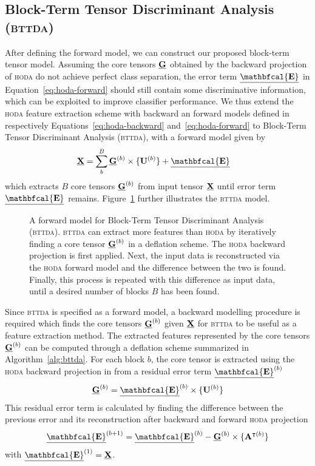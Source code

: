\documentclass[twocolumn]{article}
\begin{document}
\subsection{Block-Term Tensor Discriminant Analysis (\textsc{bttda})}
After defining the forward model, we can construct our proposed block-term
tensor model. Assuming the core tensors $\underline{\mathbf{G}}$
obtained by the backward projection of \textsc{hoda} do not achieve perfect
class separation, the error term $\ten{\mathbfcal{E}}$ in
Equation~\ref{eq:hoda-forward} should still contain some discriminative
information, which can be exploited to improve classifier performance.
We thus extend the \textsc{hoda} feature extraction scheme with backward an
forward models defined in respectively Equations~\ref{eq:hoda-backward}
and~\ref{eq:hoda-forward} to Block-Term Tensor Discriminant Analysis
(\textsc{bttda}), with a forward model given by
\begin{align}
  \ten{X} & = \sum_b^B\ten{G}^{(b)}\mmpr{\mat{U}^{(b)}} + \ten{\mathbfcal{E}}
  \label{eq:bttda-forward}
\end{align}
which extracts $B$ core tensors $\underline{\mathbf{G}}^{(b)}$ from input tensor $\underline{\mathbf{X}}$
until error term $\ten{\mathbfcal{E}}$ remains.
Figure~\ref{fig:bttda} further illustrates the \textsc{bttda} model.
\begin{figure*}
	\centering
	
  \caption{A forward model for Block-Term Tensor Discriminant Analysis
  (\textsc{bttda}). \textsc{bttda} can extract more features
 than \textsc{hoda} by iteratively finding a core tensor $\underline{\mathbf{G}}^{(b)}$ in a
 deflation scheme.
 The \textsc{hoda} backward projection is first applied. Next, the
 input data is reconstructed via the \textsc{hoda} forward model and the
 difference between the two is found.
 Finally, this process is repeated with this difference as input data, until a
 desired number of blocks $B$ has been found.}
  \label{fig:bttda}
\end{figure*}

Since \textsc{bttda} is specified as a forward model, a backward modelling
procedure is required which finds the core tensors $\underline{\mathbf{G}}^{(b)}$ given $\underline{\mathbf{X}}$ for
\textsc{bttda} to be useful as a feature extraction method.
The extracted features represented by the core tensors $\underline{\mathbf{G}}^{(b)}$ can be
computed through a deflation scheme summarized in Algorithm~\ref{alg:bttda}.
For each block $b$, the core tensor is extracted using the \textsc{hoda} backward
projection in from a residual error term
$\ten{\mathbfcal{E}}^{(b)}$
\begin{equation}
  \ten{G}^{(b)} = \ten{\mathbfcal{E}}^{(b)}\mmpr{\mat{U}^{(b)}}
\end{equation}
This residual error term is calculated by finding the difference between the
previous error and its reconstruction after backward and forward \textsc{hoda}
projection
\begin{equation}
  \ten{\mathbfcal{E}}^{(b+1)} = \ten{\mathbfcal{E}}^{(b)} - \ten{G}^{(b)}
  \mmpr{\mat{A}^{\intercal(b)}}
\end{equation}
with $\ten{\mathbfcal{E}}^{(1)}=\ten{X}$.
\end{document}
